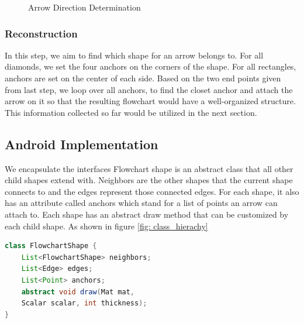 \documentclass[conference,twocolumn]{IEEEtran}
\begin{document}
\begin{figure}[!htbp]
    \centering
    \caption{Arrow Direction Determination}
    \label{fig:rectNdiam}
\end{figure}
    
\subsubsection{Reconstruction}
    In this step, we aim to find which shape for an arrow belongs to. For all diamonds, we set the four anchors on the corners of the shape. For all rectangles, anchors are set on the center of each side. Based on the two end points given from last step, we loop over all anchors, to find the closet anchor and attach the arrow on it so that the resulting flowchart would have a well-organized structure. This information collected so far would be utilized in the next section.

\subsection{Android Implementation}
We encapsulate the interfaces 
Flowchart shape is an abstract class that all other child shapes extend with. Neighbors are the other shapes that the current shape connects to and the edges represent those connected edges. For each shape, it also has an attribute called anchors which stand for a list of points an arrow can attach to. Each shape has an abstract draw method that can be customized by each child shape. As shown in figure \ref{fig: class_hierachy}
\begin{lstlisting}[language=java]
class FlowchartShape {
    List<FlowchartShape> neighbors;
    List<Edge> edges;
    List<Point> anchors;
    abstract void draw(Mat mat, 
    Scalar scalar, int thickness);
}
\end{lstlisting}
\end{document}
